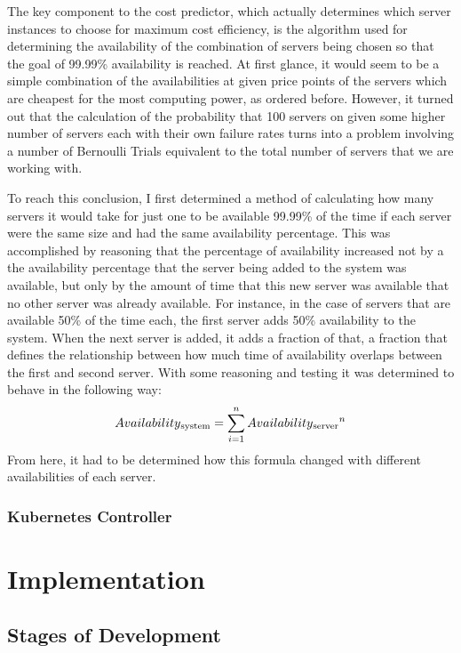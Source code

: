 \documentclass[thesis,proposal]{umassthesis}  %
\begin{document}
The key component to the cost predictor, which actually determines which server instances to choose for maximum cost efficiency, is the algorithm used for determining the availability of the combination of servers being chosen so that the goal of 99.99\% availability is reached. At first glance, it would seem to be a simple combination of the availabilities at given price points of the servers which are cheapest for the most computing power, as ordered before. However, it turned out that the calculation of the probability that 100 servers on given some higher number of servers each with their own failure rates turns into a problem involving a number of Bernoulli Trials equivalent to the total number of servers that we are working with.\par
To reach this conclusion, I first determined a method of calculating how many servers it would take for just one to be available 99.99\% of the time if each server were the same size and had the same availability percentage. This was accomplished by reasoning that the percentage of availability increased not by a the availability percentage that the server being added to the system was available, but only by the amount of time that this new server was available that no other server was already available. For instance, in the case of servers that are available 50\% of the time each, the first server adds 50\% availability to the system. When the next server is added, it adds a fraction of that, a fraction that defines the relationship between how much time of availability overlaps between the first and second server. With some reasoning and testing it was determined to behave in the following way:
$$Availability\textsubscript{system} = \sum\limits_{i=1}^{n} Availability\textsubscript{server}^n$$
From here, it had to be determined how this formula changed with different availabilities of each server.

\subsection{Kubernetes Controller}

\chapter{Implementation}

\section{Stages of Development}
\end{document}
